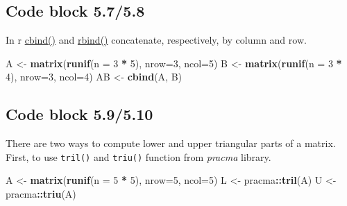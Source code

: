 \documentclass[
]{book}
\newenvironment{Shaded}{\begin{snugshade}}{\end{snugshade}}
\newcommand{\DataTypeTok}[1]{\textcolor[rgb]{0.13,0.29,0.53}{#1}}
\newcommand{\DecValTok}[1]{\textcolor[rgb]{0.00,0.00,0.81}{#1}}
\newcommand{\KeywordTok}[1]{\textcolor[rgb]{0.13,0.29,0.53}{\textbf{#1}}}
\newcommand{\NormalTok}[1]{#1}
\newcommand{\OperatorTok}[1]{\textcolor[rgb]{0.81,0.36,0.00}{\textbf{#1}}}
\newcommand{\StringTok}[1]{\textcolor[rgb]{0.31,0.60,0.02}{#1}}
\begin{document}
\hypertarget{code-block-5.75.8}{%
\subsection*{Code block 5.7/5.8}\label{code-block-5.75.8}}

In r \href{https://stat.ethz.ch/R-manual/R-devel/library/base/html/cbind.html}{cbind()} and \href{https://stat.ethz.ch/R-manual/R-devel/library/base/html/cbind.html}{rbind()} concatenate, respectively, by column and row.

\begin{Shaded}
\begin{Highlighting}[]
\NormalTok{A \textless{}{-}}\StringTok{ }\KeywordTok{matrix}\NormalTok{(}\KeywordTok{runif}\NormalTok{(}\DataTypeTok{n =} \DecValTok{3} \OperatorTok{*}\StringTok{ }\DecValTok{5}\NormalTok{), }\DataTypeTok{nrow=}\DecValTok{3}\NormalTok{, }\DataTypeTok{ncol=}\DecValTok{5}\NormalTok{)}
\NormalTok{B \textless{}{-}}\StringTok{ }\KeywordTok{matrix}\NormalTok{(}\KeywordTok{runif}\NormalTok{(}\DataTypeTok{n =} \DecValTok{3} \OperatorTok{*}\StringTok{ }\DecValTok{4}\NormalTok{), }\DataTypeTok{nrow=}\DecValTok{3}\NormalTok{, }\DataTypeTok{ncol=}\DecValTok{4}\NormalTok{)}
\NormalTok{AB \textless{}{-}}\StringTok{ }\KeywordTok{cbind}\NormalTok{(A, B)}
\end{Highlighting}
\end{Shaded}

\hypertarget{code-block-5.95.10}{%
\subsection*{Code block 5.9/5.10}\label{code-block-5.95.10}}

There are two ways to compute lower and upper triangular parts of a matrix. First, to use \texttt{tril()} and \texttt{triu()} function from \emph{pracma} library.

\begin{Shaded}
\begin{Highlighting}[]
\NormalTok{A \textless{}{-}}\StringTok{ }\KeywordTok{matrix}\NormalTok{(}\KeywordTok{runif}\NormalTok{(}\DataTypeTok{n =} \DecValTok{5} \OperatorTok{*}\StringTok{ }\DecValTok{5}\NormalTok{), }\DataTypeTok{nrow=}\DecValTok{5}\NormalTok{, }\DataTypeTok{ncol=}\DecValTok{5}\NormalTok{)}
\NormalTok{L \textless{}{-}}\StringTok{ }\NormalTok{pracma}\OperatorTok{::}\KeywordTok{tril}\NormalTok{(A)}
\NormalTok{U \textless{}{-}}\StringTok{ }\NormalTok{pracma}\OperatorTok{::}\KeywordTok{triu}\NormalTok{(A)}
\end{Highlighting}
\end{Shaded}
\end{document}
